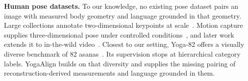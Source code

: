 \noindent\textbf{Human pose datasets.}
To our knowledge, no existing pose dataset pairs an image with measured body geometry and language grounded in that geometry.
Large collections annotate two-dimensional keypoints at scale~\cite{lin2014coco,andriluka2014mpii}.
Motion capture supplies three-dimensional pose under controlled conditions~\cite{ionescu2014human36m}, and later work extends it to in-the-wild video~\cite{vonMarcard2018}.
Closest to our setting, Yoga-82 offers a visually diverse benchmark of 82 asanas~\cite{verma2020yoga82}.
Its supervision stops at hierarchical category labels.
YogaAlign builds on that diversity and supplies the missing pairing of reconstruction-derived measurements and language grounded in them.

